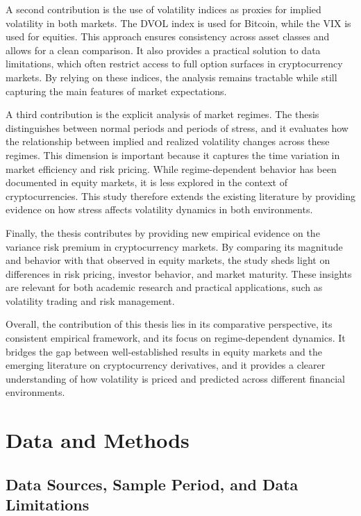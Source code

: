 \documentclass[11pt,a4paper,openany]{report}
\begin{document}
A second contribution is the use of volatility indices as proxies for
implied volatility in both markets. The DVOL index is used for Bitcoin,
while the VIX is used for equities. This approach ensures consistency
across asset classes and allows for a clean comparison. It also provides
a practical solution to data limitations, which often restrict access to
full option surfaces in cryptocurrency markets. By relying on these
indices, the analysis remains tractable while still capturing the main
features of market expectations.

A third contribution is the explicit analysis of market regimes. The
thesis distinguishes between normal periods and periods of stress, and
it evaluates how the relationship between implied and realized
volatility changes across these regimes. This dimension is important
because it captures the time variation in market efficiency and risk
pricing. While regime-dependent behavior has been documented in equity
markets, it is less explored in the context of cryptocurrencies. This
study therefore extends the existing literature by providing evidence on
how stress affects volatility dynamics in both environments.

Finally, the thesis contributes by providing new empirical evidence on
the variance risk premium in cryptocurrency markets. By comparing its
magnitude and behavior with that observed in equity markets, the study
sheds light on differences in risk pricing, investor behavior, and
market maturity. These insights are relevant for both academic research
and practical applications, such as volatility trading and risk
management.

Overall, the contribution of this thesis lies in its comparative
perspective, its consistent empirical framework, and its focus on
regime-dependent dynamics. It bridges the gap between well-established
results in equity markets and the emerging literature on cryptocurrency
derivatives, and it provides a clearer understanding of how volatility
is priced and predicted across different financial environments.

\chapter{Data and Methods}\label{data-and-methods}

\section{Data Sources, Sample Period, and Data
Limitations}\label{data-sources-sample-period-and-data-limitations}
\end{document}

